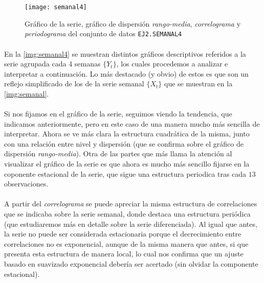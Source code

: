 \documentclass[a4paper, spanish]{article}
\begin{document}
      \begin{figure}[htb!]
        \centering
        \texttt{[image: semanal4]}
        \caption{Gráfico de la serie, gráfico de dispersión \emph{rango-media}, \emph{correlograma} y \emph{periodograma} del conjunto de datos \texttt{EJ2.SEMANAL4}}
        \label{img:semanal4}
      \end{figure}

      \paragraph{}
      En la \autoref{img:semanal4} se muestran distintos gráficos descriptivos referidos a la serie agrupada cada 4 semanas $\{Y_t\}$, los cuales procedemos a analizar e interpretar a continuación. Lo más destacado (y obvio) de estos es que son un reflejo simplificado de los de la serie semanal $\{X_t\}$ que se muestran en la \autoref{img:semanal}.

      \paragraph{}
      Si nos fijamos en el gráfico de la serie, seguimos viendo la tendencia, que indicamos anteriormente, pero en este caso de una manera mucho más sencilla de interpretar. Ahora se ve más clara la estructura cuadrática de la misma, junto con una relación entre nivel y dispersión (que se confirma sobre el gráfico de dispersión \emph{rango-media}). Otra de las partes que más llama la atención al visualizar el gráfico de la serie es que ahora es mucho más sencillo fijarse en la coponente estacional de la serie, que sigue una estructura periodica tras cada $13$ observaciones.

      \paragraph{}
      A partir del \emph{correlograma} se puede apreciar la misma estructura de correlaciones que se indicaba sobre la serie semanal, donde destaca una estructura periódica (que estudiaremos más en detalle sobre la serie diferenciada). Al igual que antes, la serie no puede ser considerada estacionaria porque el decrecimiento entre correlaciones no es exponencial, aunque de la misma manera que antes, si que presenta esta estructura de manera local, lo cual nos confirma que un ajuste basado en suavizado exponencial debería ser acertado (sin olvidar la componente estacional).
\end{document}
